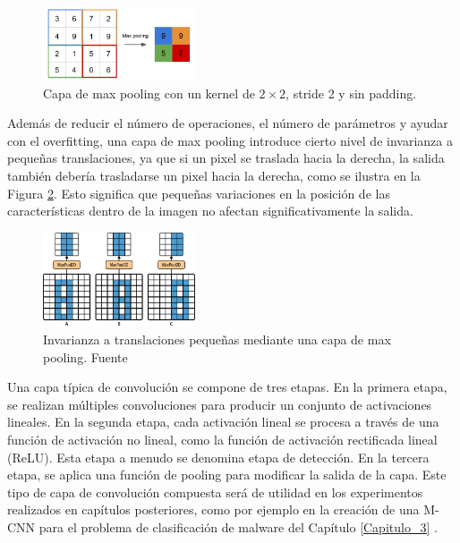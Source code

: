 \begin{figure}[h!]
\centering
\includegraphics[width=0.4\textwidth]{img/maxpooling.png}
\caption{Capa de max pooling con un kernel de \( 2 \times 2 \), stride 2 y sin padding.}
\label{fig:maxpooling}
\end{figure}

Además de reducir el número de operaciones, el número de parámetros y ayudar con el overfitting, una capa de max pooling introduce cierto nivel de invarianza a pequeñas translaciones, ya que si un pixel se traslada hacia la derecha, la salida también debería trasladarse un pixel hacia la derecha, como se ilustra en la Figura \ref{fig:translacionPooling}. Esto significa que pequeñas variaciones en la posición de las características dentro de la imagen no afectan significativamente la salida.


\begin{figure}[h!]
\centering
\includegraphics[width=0.4\textwidth]{img/translacionPooling.png}
\caption{Invarianza a translaciones pequeñas mediante una capa de max pooling. Fuente \citep{geron2022hands}}
\label{fig:translacionPooling}
\end{figure}

Una capa típica de convolución se compone de tres etapas. En la primera etapa, se realizan múltiples convoluciones para producir un conjunto de activaciones lineales. En la segunda etapa, cada activación lineal se procesa a través de una función de activación no lineal, como la función de activación rectificada lineal (ReLU). Esta etapa a menudo se denomina etapa de detección. En la tercera etapa, se aplica una función de pooling para modificar la salida de la capa. Este tipo de capa de convolución compuesta será de utilidad en los experimentos realizados en capítulos posteriores, como por ejemplo en la creación de una M-CNN para el problema de clasificación de malware del Capítulo \ref{Capitulo_3} \citep{pajares2021aprendizaje}.


